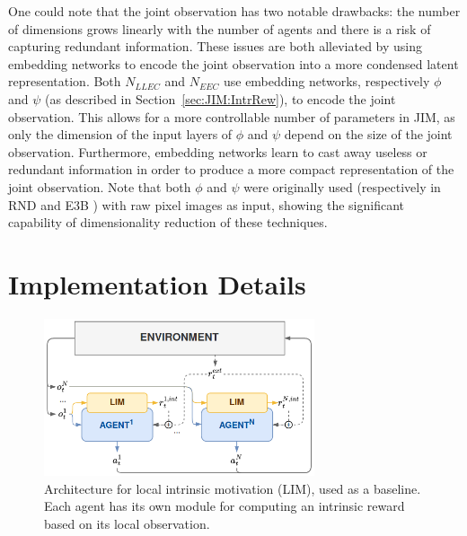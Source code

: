 One could note that the joint observation has two notable drawbacks: the number of dimensions grows linearly with the number of agents and there is a risk of capturing redundant information. These issues are both alleviated by using embedding networks to encode the joint observation into a more condensed latent representation. Both $N_{LLEC}$ and $N_{EEC}$ use embedding networks, respectively $\phi$ and $\psi$ (as described in Section~\ref{sec:JIM:IntrRew}), to encode the joint observation. This allows for a more controllable number of parameters in JIM, as only the dimension of the input layers of $\phi$ and $\psi$ depend on the size of the joint observation. Furthermore, embedding networks learn to cast away useless or redundant information in order to produce a more compact representation of the joint observation. Note that both $\phi$ and $\psi$ were originally used (respectively in RND \citep{Burda2019_RND} and E3B \citep{Henaff2022_E3B}) with raw pixel images as input, showing the significant capability of dimensionality reduction of these techniques.









\section{Implementation Details}\label{sec:JIM:ImpDetails}

\begin{figure}[t]
    \centering
    \includegraphics[width=0.71\textwidth]{Figures/JIM/archi_lim.png}
    \caption{Architecture for local intrinsic motivation (LIM), used as a baseline. Each agent has its own module for computing an intrinsic reward based on its local observation.}
    \label{fig:JIM:archi_lim}
\end{figure}

